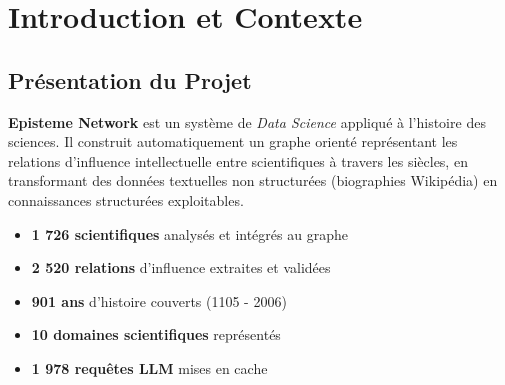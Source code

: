 \documentclass[12pt,a4paper]{report}
\begin{document}
\begin{titlepage}
\begin{center}
    \vfill

\end{center}
\end{titlepage}

\newpage
\thispagestyle{empty}
\tableofcontents

\newpage

\chapter{Introduction et Contexte}

\section{Présentation du Projet}

\textbf{Episteme Network} est un système de \textit{Data Science} appliqué à l'histoire des sciences. Il construit automatiquement un graphe orienté représentant les relations d'influence intellectuelle entre scientifiques à travers les siècles, en transformant des données textuelles non structurées (biographies Wikipédia) en connaissances structurées exploitables.

\begin{successbox}
\begin{itemize}
    \item \textbf{1 726 scientifiques} analysés et intégrés au graphe
    \item \textbf{2 520 relations} d'influence extraites et validées
    \item \textbf{901 ans} d'histoire couverts (1105 - 2006)
    \item \textbf{10 domaines scientifiques} représentés
    \item \textbf{1 978 requêtes LLM} mises en cache
\end{itemize}
\end{successbox}
\end{document}
